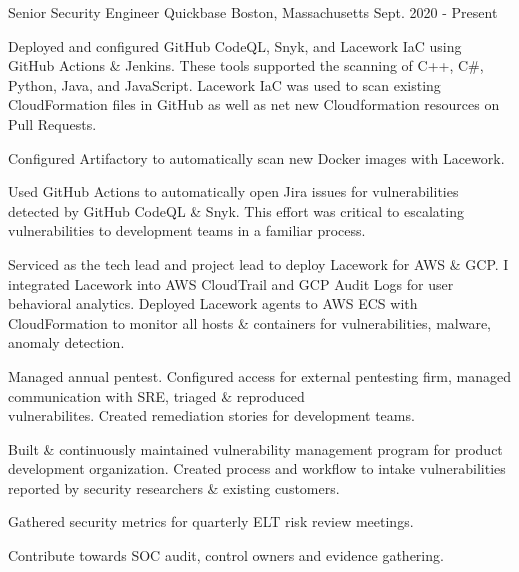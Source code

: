 

\begin{cventries}
\vspace{-3mm}
  \cventry
    {Senior Security Engineer} %
    {Quickbase} %
    {Boston, Massachusetts} %
    {Sept. 2020 - Present} %
    {
      \begin{cvitems} %
        \item {
            Deployed and configured GitHub CodeQL, Snyk, and Lacework IaC using GitHub Actions \& Jenkins. These tools supported the scanning of C++, C\#, Python, Java, and JavaScript. Lacework IaC was used to scan existing CloudFormation files in GitHub as well as net new Cloudformation resources on Pull Requests. 
        }
        \item {
            Configured Artifactory to automatically scan new Docker images with Lacework.
        }
        \item {
            Used GitHub Actions to automatically open Jira issues for vulnerabilities detected by GitHub CodeQL \& Snyk. This effort was critical to escalating vulnerabilities to development teams in a familiar process.
        }
        \item {
            Serviced as the tech lead and project lead to deploy Lacework for AWS \& GCP. I integrated Lacework into AWS CloudTrail and GCP Audit Logs for user behavioral analytics. Deployed Lacework agents to AWS ECS with CloudFormation to monitor all hosts \& containers for vulnerabilities, malware, anomaly detection.
        }
        \item {
            Managed annual pentest. Configured access for external pentesting firm, managed communication with SRE, triaged \& reproduced\\ vulnerabilites. Created remediation stories for development teams.
        }
        \item {
            Built \& continuously maintained vulnerability management program for product development organization. Created process and workflow to intake vulnerabilities reported by security researchers \& existing customers.
        }
        \item {
            Gathered security metrics for quarterly ELT risk review meetings.
        }
        \item {
            Contribute towards SOC audit, control owners and evidence gathering.
        }
      \end{cvitems}
    }


\end{cventries}
